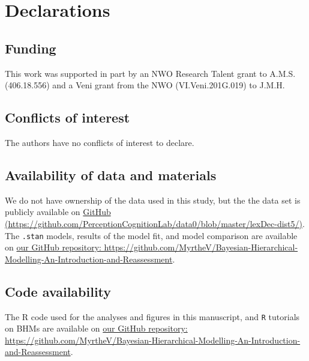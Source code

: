 \documentclass[
  english,
  doc,floatsintext]{apa6}
\begin{document}
\hypertarget{declarations}{%
\section{Declarations}\label{declarations}}

\hypertarget{funding}{%
\subsection{Funding}\label{funding}}

This work was supported in part by an NWO Research Talent grant to A.M.S. (406.18.556) and a Veni grant from the NWO (VI.Veni.201G.019) to J.M.H.

\hypertarget{conflicts-of-interest}{%
\subsection{Conflicts of interest}\label{conflicts-of-interest}}

The authors have no conflicts of interest to declare.

\hypertarget{availability-of-data-and-materials}{%
\subsection{Availability of data and materials}\label{availability-of-data-and-materials}}

We do not have ownership of the data used in this study, but the the data set is publicly available on \href{https://github.com/PerceptionCognitionLab/data0/blob/master/lexDec-dist5/}{GitHub (https://github.com/PerceptionCognitionLab/data0/blob/master/lexDec-dist5/)}. The \texttt{.stan} models, results of the model fit, and model comparison are available on \href{https://github.com/MyrtheV/Bayesian-Hierarchical-Modelling-An-Introduction-and-Reassessment}{our GitHub repository: https://github.com/MyrtheV/Bayesian-Hierarchical-Modelling-An-Introduction-and-Reassessment}.

\hypertarget{code-availability}{%
\subsection{Code availability}\label{code-availability}}

The R code used for the analyses and figures in this manuscript, and \texttt{R} tutorials on BHMs are available on \href{https://github.com/MyrtheV/Bayesian-Hierarchical-Modelling-An-Introduction-and-Reassessment}{our GitHub repository: https://github.com/MyrtheV/Bayesian-Hierarchical-Modelling-An-Introduction-and-Reassessment}.
\end{document}
